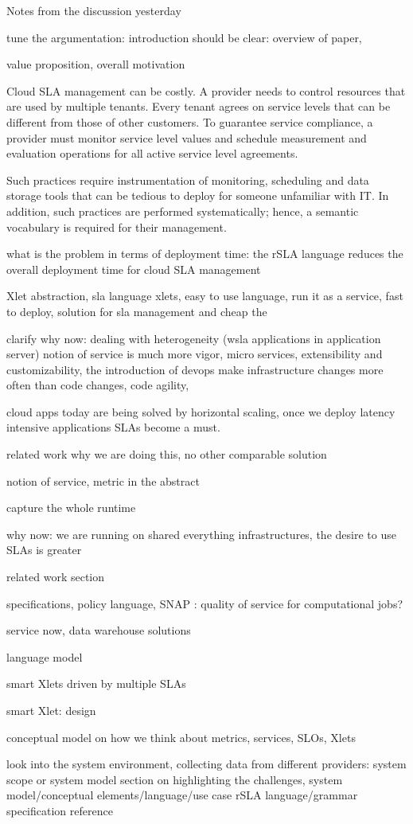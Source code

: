 Notes from the discussion yesterday

tune the argumentation: introduction should be clear: overview of paper, 

value proposition, overall motivation

Cloud SLA management can be costly. A provider needs to control resources that are used by multiple tenants. Every tenant agrees on service levels that can be different from those of other customers. To guarantee service compliance, a provider must monitor service level values and schedule measurement and evaluation operations for all active service level agreements. 

Such practices require instrumentation of monitoring, scheduling and data storage tools that can be tedious to deploy for someone unfamiliar with IT. In addition, such practices are performed systematically; hence, a semantic vocabulary is required for their management.

what is the problem in terms of deployment time: the rSLA language reduces the overall deployment time for cloud SLA management 

Xlet abstraction, 
sla language  xlets, easy to use language, run it as a service, fast to deploy, solution for sla management and cheap the 

clarify why now: dealing with heterogeneity (wsla applications in application server) notion of service is much more vigor, micro services,  extensibility and customizability, the introduction of devops make infrastructure changes more often than code changes, code agility, 

cloud apps today are being solved by horizontal scaling, once we deploy latency intensive applications SLAs become a must. 

related work why we are doing this, no other comparable solution

notion of service, metric in the abstract

capture the whole runtime

why now: we are running on shared everything infrastructures, the desire to use SLAs is greater

related work section

specifications, policy language, SNAP : quality of service for computational jobs? 

service now, data warehouse solutions

language model

smart Xlets driven by multiple SLAs

smart Xlet: design 

conceptual model on how we think about metrics, services, SLOs, Xlets

look into the system environment, collecting data from different providers: system scope or system model 
section on highlighting the challenges, 
system model/conceptual elements/language/use case
rSLA language/grammar specification reference 


